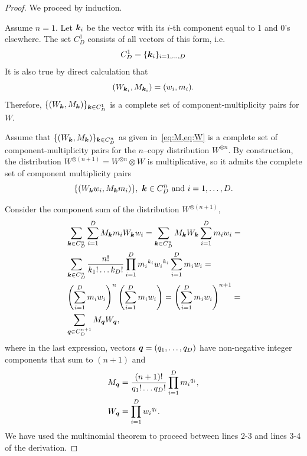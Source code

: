 \begin{proof}
	We proceed by induction.
	
	Assume $n = 1$.
	Let $\bm{k}_i$ be the vector with its $i$-th component equal to 1 and 0's elsewhere.
	The set $C_D^1$ consists of all vectors of this form, i.e. 
\begin{equation*}
	C_D^1 = \{ \bm{k}_i \}_{i=1,\dots,D}
\end{equation*}
	It is also true by direct calculation that
\begin{equation*}
	\left( W_{\bm{k}_i}, M_{\bm{k}_i} \right) = (w_i, m_i).
\end{equation*}
Therefore, $\{ (W_{\bm{k}}, M_{\bm{k}}) \}_{\bm{k} \in C_D^1}$ is a complete set of component-multiplicity pairs for $W$.

	Assume that $\{(W_{\bm{k}}, M_{\bm{k}})\}_{\bm{k} \in C_D^n}$ as given in~\cref{eq:M,eq:W} is a complete set of component-multiplicity pairs for the $n$--copy distribution $W^{\otimes n}$.
	By construction, the distribution $W^{\otimes (n+1)} = W^{\otimes n} \otimes W$ is multiplicative, so it admits the complete set of component multiplicity pairs
\begin{equation}
	\{(W_{\bm{k}} w_i, M_{\bm{k}} m_i)\},\ \bm{k} \in C_D^n \text{ and } i=1,\dots,D.
\end{equation}
	
	Consider the component sum of the distribution $W^{\otimes (n+1)}$,
\begin{align*}
	&\sum_{\bm{k} \in C_D^n}\sum_{i=1}^D M_{\bm{k}} m_i W_{\bm{k}} w_i = \sum_{\bm{k} \in C_D^n} M_{\bm{k}}W_{\bm{k}} \sum_{i=1}^D m_i w_i =\\
	&\sum_{\bm{k} \in C_D^n} \frac{n!}{k_1!\dots k_D!} \prod\limits_{i=1}^D {m_i}^{k_i}{w_i}^{k_i} \sum_{i=1}^D m_i w_i =\\
	&\left( \sum_{i=1}^D m_i w_i \right)^n \left( \sum_{i=1}^D m_i w_i \right) = \left( \sum_{i=1}^D m_i w_i \right)^{n+1} =\\
	&\sum_{\bm{q} \in C_D^{n+1}} M_{\bm{q}}W_{\bm{q}},
\end{align*}
where in the last expression, vectors $\bm{q} = (q_1, \dots, q_D)$ have non-negative integer components that sum to $(n+1)$ and 
\begin{align*}
	M_{\bm{q}} &= \frac{(n+1)!}{q_1!\dots q_D!} \prod\limits_{i=1}^D {m_i}^{q_i},\\
	W_{\bm{q}} &= \prod\limits_{i=1}^D {w_i}^{q_i}.
\end{align*}
We have used the multinomial theorem to proceed between lines 2-3 and lines 3-4 of the derivation.


\end{proof}

